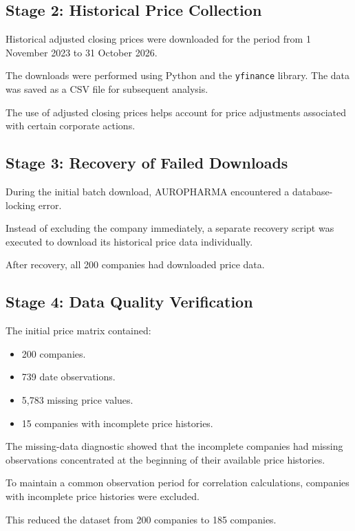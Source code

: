 \documentclass[11pt,a4paper]{article}
\begin{document}
\subsection{Stage 2: Historical Price Collection}

Historical adjusted closing prices were downloaded for the
period from 1 November 2023 to 31 October 2026.

The downloads were performed using Python and the
\texttt{yfinance} library. The data was saved as a CSV file
for subsequent analysis.

The use of adjusted closing prices helps account for
price adjustments associated with certain corporate actions.

\subsection{Stage 3: Recovery of Failed Downloads}

During the initial batch download, AUROPHARMA encountered
a database-locking error.

Instead of excluding the company immediately, a separate
recovery script was executed to download its historical
price data individually.

After recovery, all 200 companies had downloaded price data.

\subsection{Stage 4: Data Quality Verification}

The initial price matrix contained:

\begin{itemize}
    \item 200 companies.
    \item 739 date observations.
    \item 5,783 missing price values.
    \item 15 companies with incomplete price histories.
\end{itemize}

The missing-data diagnostic showed that the incomplete
companies had missing observations concentrated at the
beginning of their available price histories.

To maintain a common observation period for correlation
calculations, companies with incomplete price histories
were excluded.

This reduced the dataset from 200 companies to 185 companies.
\end{document}
